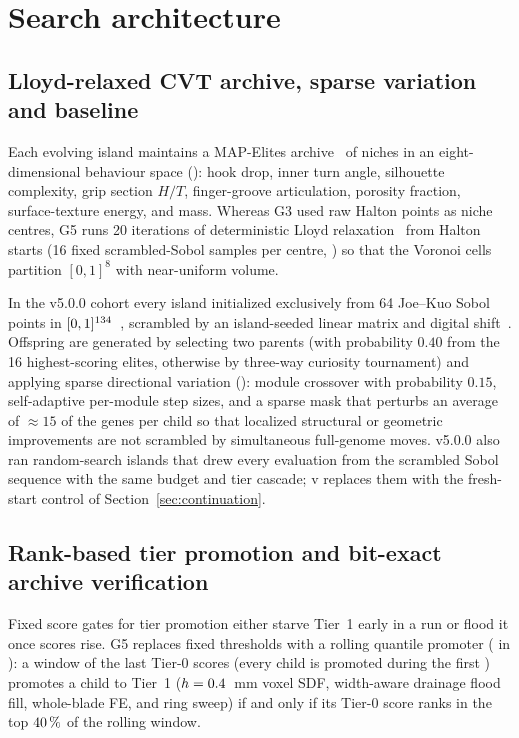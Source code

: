 \section{Search architecture}\label{sec:search}
\subsection{Lloyd-relaxed CVT archive, sparse variation and baseline}
Each evolving island maintains a MAP-Elites archive~\cite{mouret2015,vassiliades2018} of \gArchiveNiches{} niches in an eight-dimensional
behaviour space (): hook drop, inner turn angle, silhouette
complexity, grip section $H/T$, finger-groove articulation, porosity fraction, surface-texture energy, and mass. Whereas G3
used raw Halton points as niche centres, G5 runs 20 iterations of deterministic Lloyd relaxation~\cite{lloyd1982,vassiliades2018}
from Halton starts (16 fixed scrambled-Sobol samples per centre, ) so that
the Voronoi cells partition $[0,1]^8$ with near-uniform volume.

In the v5.0.0 cohort every island initialized exclusively from 64 Joe--Kuo Sobol points in $[0,1]^{134}$~\cite{joe2008}, scrambled by an
island-seeded linear matrix and digital shift~\cite{matousek1998}. Offspring are generated by selecting two parents (with
probability $0.40$ from the 16 highest-scoring elites, otherwise by three-way curiosity tournament) and applying sparse
directional variation (): module crossover with probability
$0.15$, self-adaptive per-module step sizes, and a sparse mask that perturbs an average of $\approx 15$ of the \gGeneCount{}
genes per child so that localized structural or geometric improvements are not scrambled by simultaneous full-genome moves.
v5.0.0 also ran random-search islands that drew every evaluation from the scrambled Sobol sequence with the same budget and
tier cascade; v\gRecord{} replaces them with the fresh-start control of Section~\ref{sec:continuation}.

\subsection{Rank-based tier promotion and bit-exact archive verification}
Fixed score gates for tier promotion either starve Tier~1 early in a run or flood it once scores rise. G5 replaces fixed
thresholds with a rolling quantile promoter ( in ): a window
of the last \gPromoWindow{} Tier-0 scores (every child is promoted during the first \gPromoWarmup) promotes a child to Tier~1 ($h = 0.4$~mm voxel SDF, width-aware drainage flood fill, whole-blade
 FE, and  ring sweep) if and only if its Tier-0 score ranks in the top $40\,\%$ of the
rolling window.

